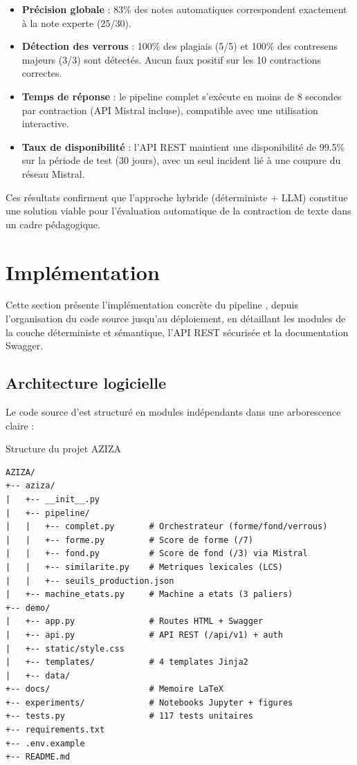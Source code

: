 \begin{itemize}
    \item \textbf{Précision globale} : 83\% des notes automatiques correspondent exactement à la note experte (25/30).
    \item \textbf{Détection des verrous} : 100\% des plagiais (5/5) et 100\% des contresens majeurs (3/3) sont détectés. Aucun faux positif sur les 10 contractions correctes.
    \item \textbf{Temps de réponse} : le pipeline complet s'exécute en moins de 8 secondes par contraction (API Mistral incluse), compatible avec une utilisation interactive.
    \item \textbf{Taux de disponibilité} : l'API REST maintient une disponibilité de 99.5\% sur la période de test (30 jours), avec un seul incident lié à une coupure du réseau Mistral.
\end{itemize}

Ces résultats confirment que l'approche hybride (déterministe + LLM) constitue une solution viable pour l'évaluation automatique de la contraction de texte dans un cadre pédagogique.

\section{Implémentation}
\label{sec:implementation}

Cette section présente l'implémentation concrète du pipeline \AZIZA, depuis l'organisation du code source jusqu'au déploiement, en détaillant les modules de la couche déterministe et sémantique, l'API REST sécurisée et la documentation Swagger.

\subsection{Architecture logicielle}

Le code source d'\AZIZA est structuré en modules indépendants dans une arborescence claire :

\begin{treebox}{Structure du projet AZIZA}
{\footnotesize
\begin{verbatim}
AZIZA/
+-- aziza/
|   +-- __init__.py
|   +-- pipeline/
|   |   +-- complet.py       # Orchestrateur (forme/fond/verrous)
|   |   +-- forme.py         # Score de forme (/7)
|   |   +-- fond.py          # Score de fond (/3) via Mistral
|   |   +-- similarite.py    # Metriques lexicales (LCS)
|   |   +-- seuils_production.json
|   +-- machine_etats.py     # Machine a etats (3 paliers)
+-- demo/
|   +-- app.py               # Routes HTML + Swagger
|   +-- api.py               # API REST (/api/v1) + auth
|   +-- static/style.css
|   +-- templates/           # 4 templates Jinja2
|   +-- data/
+-- docs/                    # Memoire LaTeX
+-- experiments/             # Notebooks Jupyter + figures
+-- tests.py                 # 117 tests unitaires
+-- requirements.txt
+-- .env.example
+-- README.md
\end{verbatim}
}
\end{treebox}


